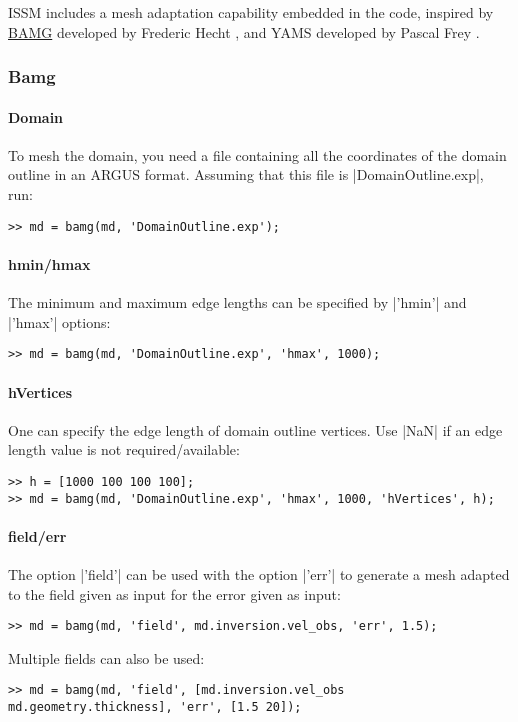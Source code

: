 ISSM includes a mesh adaptation capability embedded in the code, inspired by \href{https://people.math.sc.edu/Burkardt/data/bamg/bamg.html}{BAMG} developed by Frederic Hecht \citep{Hecht2006}, and YAMS developed by Pascal Frey \citep{Frey2001}.
\subsubsection{Bamg}%
\paragraph{Domain}
To mesh the domain, you need a file containing all the coordinates of the domain outline in an ARGUS format. Assuming that this file is \lstinlinebg|DomainOutline.exp|, run:
\begin{lstlisting}
>> md = bamg(md, 'DomainOutline.exp');
\end{lstlisting}

\paragraph{hmin/hmax}
The minimum and maximum edge lengths can be specified by \lstinlinebg|'hmin'| and \lstinlinebg|'hmax'| options:
\begin{lstlisting}
>> md = bamg(md, 'DomainOutline.exp', 'hmax', 1000);
\end{lstlisting}

\paragraph{hVertices}
One can specify the edge length of domain outline vertices. Use \lstinlinebg|NaN| if an edge length value is not required/available:
\begin{lstlisting}
>> h = [1000 100 100 100];
>> md = bamg(md, 'DomainOutline.exp', 'hmax', 1000, 'hVertices', h);
\end{lstlisting}

\paragraph{field/err}
The option \lstinlinebg|'field'| can be used with the option \lstinlinebg|'err'| to generate a mesh adapted to the field given as input for the error given as input:
\begin{lstlisting}
>> md = bamg(md, 'field', md.inversion.vel_obs, 'err', 1.5);
\end{lstlisting}
Multiple fields can also be used:
\begin{lstlisting}
>> md = bamg(md, 'field', [md.inversion.vel_obs md.geometry.thickness], 'err', [1.5 20]);
\end{lstlisting}


